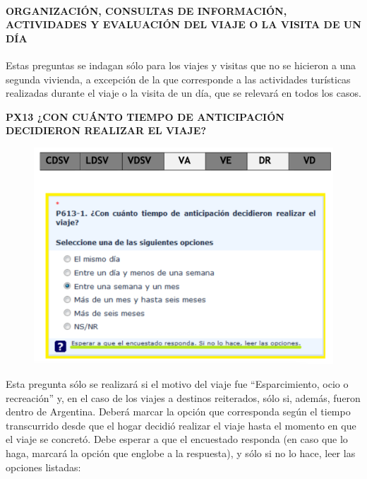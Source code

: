 \documentclass[
  openany]{book}
\begin{document}
\hypertarget{organizacion-consultas-de-informacion-actividades-y-evaluacion-del-viaje-o-la-visita-de-un-duxeda}{%
\paragraph{\texorpdfstring{\textbf{ORGANIZACIÓN, CONSULTAS DE INFORMACIÓN, ACTIVIDADES Y EVALUACIÓN DEL VIAJE O LA VISITA DE UN DÍA}}{ORGANIZACIÓN, CONSULTAS DE INFORMACIÓN, ACTIVIDADES Y EVALUACIÓN DEL VIAJE O LA VISITA DE UN DÍA}}\label{organizacion-consultas-de-informacion-actividades-y-evaluacion-del-viaje-o-la-visita-de-un-duxeda}}

Estas preguntas se indagan sólo para los viajes y visitas que no se hicieron a una segunda vivienda, a excepción de la que corresponde a las actividades turísticas realizadas durante el viaje o la visita de un día, que se relevará en todos los casos.

\textbf{PX13 ¿CON CUÁNTO TIEMPO DE ANTICIPACIÓN DECIDIERON REALIZAR EL VIAJE?}

\begin{figure}

{\centering \includegraphics[width=1\linewidth]{imagenes/figura6-105} 

}

\end{figure}

Esta pregunta sólo se realizará si el motivo del viaje fue ``Esparcimiento, ocio o recreación'' y, en el caso de los viajes a destinos reiterados, sólo si, además, fueron dentro de Argentina. Deberá marcar la opción que corresponda según el tiempo transcurrido desde que el hogar decidió realizar el viaje hasta el momento en que el viaje se concretó. Debe esperar a que el encuestado responda (en caso que lo haga, marcará la opción que englobe a la respuesta), y sólo si no lo hace, leer las opciones listadas:
\end{document}
